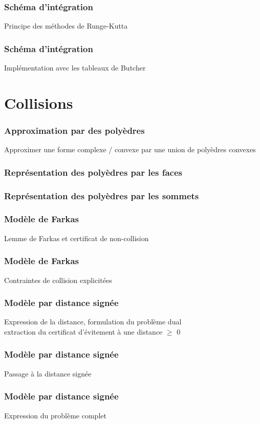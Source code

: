 \documentclass{beamer}
\begin{document}
	\begin{frame}
		\frametitle{Schéma d'intégration}
		Principe des méthodes de Runge-Kutta
	\end{frame}
	
	\begin{frame}
		\frametitle{Schéma d'intégration}
		Implémentation avec les tableaux de Butcher
	\end{frame}
	
	
	
	\section{Collisions}
	
	\begin{frame}
		\frametitle{Approximation par des polyèdres}
		Approximer une forme complexe / convexe par une union de polyèdres convexes
	\end{frame}
	
	\begin{frame}
		\frametitle{Représentation des polyèdres par les faces}
	\end{frame}
	
	\begin{frame}
		\frametitle{Représentation des polyèdres par les sommets}
	\end{frame}
	
	\begin{frame}
		\frametitle{Modèle de Farkas}
		Lemme de Farkas et certificat de non-collision
	\end{frame}
	
	\begin{frame}
		\frametitle{Modèle de Farkas}
		Contraintes de collision explicitées
	\end{frame}
	
	\begin{frame}
		\frametitle{Modèle par distance signée}
		Expression de la distance, formulation du problème dual\\
		extraction du certificat d'évitement à une distance $\geq$ 0
	\end{frame}
	
	\begin{frame}
		\frametitle{Modèle par distance signée}
		Passage à la distance signée
	\end{frame}
	
	\begin{frame}
		\frametitle{Modèle par distance signée}
		Expression du problème complet
	\end{frame}
	
\end{document}
